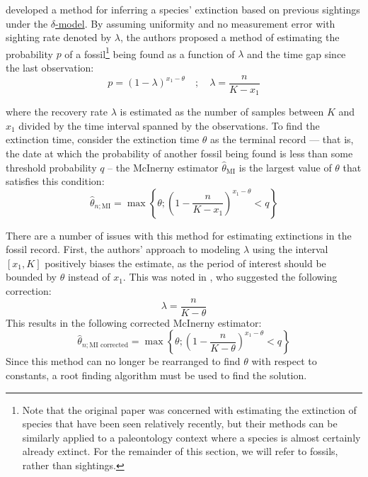 \citet{Mcinerny2006} developed a method for inferring a species' extinction based on previous sightings under the \hyperref[model: no-measurement-error]{$\delta$-model}. By assuming uniformity and no measurement error with sighting rate denoted by $\lambda$, the authors proposed a method of estimating the probability $p$ of a fossil\footnote{Note that the original paper was concerned with estimating the extinction of species that have been seen relatively recently, but their methods can be similarly applied to a paleontology context where a species is almost certainly already extinct. For the remainder of this section, we will refer to fossils, rather than sightings.} being found as a function of $\lambda$ and the time gap since the last observation:
\[
p = \left( 1 - \lambda \right)^{x_1 - \theta} \quad;\quad \lambda = \frac{n}{K - x_1}
\]

where the recovery rate $\lambda$ is estimated as the number of samples between $K$ and $x_1$ divided by the time interval spanned by the observations. To find the extinction time, consider the extinction time $\theta$ as the terminal record --- that is, the date at which the probability of another fossil being found is less than some threshold probability $q$ -- the McInerny estimator $\hat\theta_{\text{MI}}$ is the largest value of $\theta$ that satisfies this condition:
\begin{equation}\label{eqn:mcinerny-estimator}
    \hat\theta_{n; \text{MI}} = \max\left\{ \theta ; \left( 1 - \frac{n}{K - x_1} \right)^{x_1 - \theta} < q \right\}
\end{equation}

There are a number of issues with this method for estimating extinctions in the fossil record. First, the authors' approach to modeling $\lambda$ using the interval $[x_1, K]$ positively biases the estimate, as the period of interest should be bounded by $\theta$ instead of $x_1$. This was noted in \citet{Huang2019}, who suggested the following correction: \[ \lambda = \frac{n}{K - \theta} \] This results in the following corrected McInerny estimator: \begin{equation}\label{eqn:mcinerny-bias-corrected-estimator}
    \hat\theta_{n; \text{MI corrected}} = \max\left\{ \theta ; \left( 1 - \frac{n}{K - \theta} \right)^{x_1 - \theta} < q \right\}
\end{equation}
Since this method can no longer be rearranged to find $\theta$ with respect to constants, a root finding algorithm must be used to find the solution.

